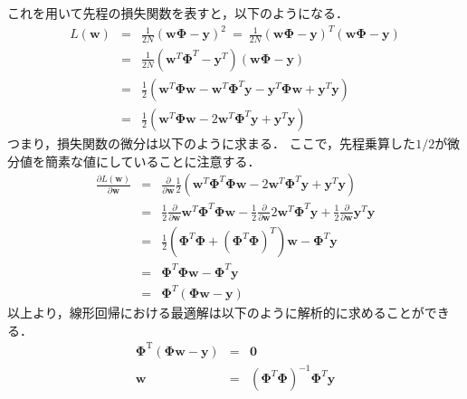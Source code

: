     これを用いて先程の損失関数を表すと，以下のようになる．
    \begin{eqnarray}
        L(\bm{w}) &=& \frac{1}{2N}\left( \bm{w\Phi} - \bm{y} \right)^2\  =\  \frac{1}{2N}\left( \bm{w\Phi} - \bm{y} \right)^T \left( \bm{w\Phi} - \bm{y} \right)\\
        &=& \frac{1}{2N}\left( \bm{w}^T\bm{\Phi}^T - \bm{y}^T \right) \left( \bm{w\Phi} - \bm{y} \right)\\
        &=& \frac{1}{2}\left(\bm{w}^T \bm{\Phi} \boldsymbol{w}-\boldsymbol{w}^T \bm{\Phi}^T \boldsymbol{y}-\boldsymbol{y}^T \bm{\Phi} \boldsymbol{w}+\boldsymbol{y}^T \boldsymbol{y}\right)\\
        &=& \frac{1}{2}\left(\bm{w}^T \bm{\Phi} \boldsymbol{w}-2\boldsymbol{w}^T \bm{\Phi}^T \boldsymbol{y}+\boldsymbol{y}^T \boldsymbol{y}\right)
    \end{eqnarray}
    つまり，損失関数の微分は以下のように求まる．
    ここで，先程乗算した$1/2$が微分値を簡素な値にしていることに注意する．
    \begin{eqnarray}
        \frac{\partial L(\boldsymbol{w})}{\partial \boldsymbol{w}} 
        &=&\frac{\partial}{\partial \boldsymbol{w}} \frac{1}{2}\left(\boldsymbol{w}^T \bm{\Phi}^T \bm{\Phi} \boldsymbol{w}-2 \boldsymbol{w}^T \bm{\Phi}^T \boldsymbol{y}+\boldsymbol{y}^T \boldsymbol{y}\right) \\
        &=&\frac{1}{2} \frac{\partial}{\partial \boldsymbol{w}} \boldsymbol{w}^T \bm{\Phi}^T \bm{\Phi} \boldsymbol{w}-\frac{1}{2} \frac{\partial}{\partial \boldsymbol{w}} 2 \boldsymbol{w}^T \bm{\Phi}^T \boldsymbol{y}+\frac{1}{2} \frac{\partial}{\partial \boldsymbol{w}} \boldsymbol{y}^T \boldsymbol{y} \\
        &=&\frac{1}{2}\left(\bm{\Phi}^T \bm{\Phi}+\left(\bm{\Phi}^T \bm{\Phi}\right)^T\right) \boldsymbol{w}-\bm{\Phi}^T \boldsymbol{y} \\
        &=&\bm{\Phi}^T \bm{\Phi} \boldsymbol{w}-\bm{\Phi}^T \boldsymbol{y}\\
        &=&\bm{\Phi}^T \left( \bm{\Phi} \boldsymbol{w} - \boldsymbol{y} \right)
    \end{eqnarray}
    以上より，線形回帰における最適解は以下のように解析的に求めることができる．
    \begin{eqnarray}
        \bm{\Phi}^{\mathrm{T}}(\bm{\Phi} \boldsymbol{w}-\boldsymbol{y})&=&\mathbf{0} \\
        \boldsymbol{w}&=&\left(\bm{\Phi}^T \bm{\Phi}\right)^{-1} \bm{\Phi}^T \boldsymbol{y}
    \end{eqnarray}
    
